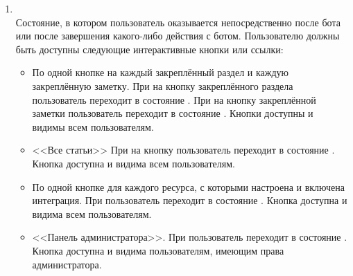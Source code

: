 \begin{enumerate}
            \item \label{itm:req:ui:states:mainmenu}
                 \\
                Состояние, в котором пользователь оказывается непосредственно после 
                бота или после завершения какого-либо действия с ботом. Пользователю должны быть доступны
                следующие интерактивные кнопки или ссылки:
                \begin{itemize}
                    \item
                        По одной кнопке на каждый закреплённый раздел и каждую закреплённую заметку.
                        При  на кнопку закреплённого раздела пользователь переходит
                        в состояние
                        \hyperref[itm:req:ui:states:navx]
                        {}.
                        При  на кнопку закреплённой заметки пользователь переходит
                        в состояние
                        \hyperref[itm:req:ui:states:view-note]
                        {}.
                        Кнопки доступны и видимы всем пользователям.
                    \item
                        <<Все статьи>>
                        При  на кнопку пользователь переходит в состояние
                        \hyperref[itm:req:ui:states:view-note]
                        {}.
                        Кнопка доступна и видима всем пользователям.
                    \item
                        По одной кнопке для каждого ресурса, с которыми настроена и включена интеграция.
                        При  пользователь переходит в состояние
                        \hyperref[itm:req:ui:states:integrationx]
                        {}.
                        Кнопка доступна и видима всем пользователям.
                    \item
                        <<Панель администратора>>.
                        При  пользователь переходит в состояние
                        \hyperref[itm:req:ui:states:adminpanel]
                        {}.
                        Кнопка доступна и видима пользователям, имеющим права администратора.

\end{itemize}
\end{enumerate}
